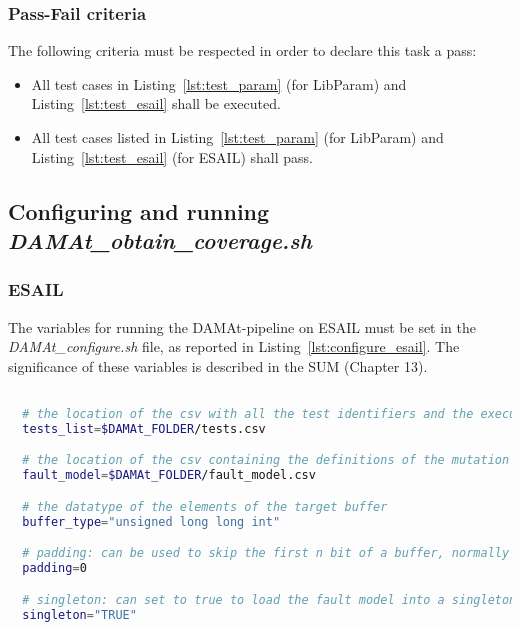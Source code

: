   \subsubsection{Pass-Fail criteria}

  The following criteria must be respected in order to declare this task a pass:

  \begin{itemize}
    \item All test cases in Listing~\ref{lst:test_param} (for LibParam) and Listing~\ref{lst:test_esail} shall be executed.
    \item All test cases listed in Listing~\ref{lst:test_param} (for LibParam) and Listing~\ref{lst:test_esail} (for ESAIL) shall pass.
  \end{itemize}

\subsection{Configuring and running \emph{DAMAt\_obtain\_coverage.sh}}

\subsubsection{ESAIL}

The variables for running the DAMAt-pipeline on ESAIL must be set in the \emph{DAMAt\_configure.sh} file, as reported in Listing~\ref{lst:configure_esail}. The significance of these variables is described in the SUM (Chapter 13).

  \begin{lstlisting}[language=bash, label={lst:configure_esail}]

  # the location of the csv with all the test identifiers and the execution time
  tests_list=$DAMAt_FOLDER/tests.csv

  # the location of the csv containing the definitions of the mutation operators
  fault_model=$DAMAt_FOLDER/fault_model.csv

  # the datatype of the elements of the target buffer
  buffer_type="unsigned long long int"

  # padding: can be used to skip the first n bit of a buffer, normally set to 0
  padding=0

  # singleton: can set to true to load the fault model into a singleton   variable, normally set to "TRUE", can also  be set to "FALSE"
  singleton="TRUE"

  \end{lstlisting}

